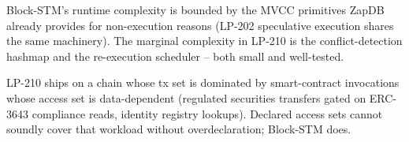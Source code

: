 Block-STM's runtime complexity is bounded by the MVCC primitives
ZapDB already provides for non-execution reasons (LP-202 speculative
execution shares the same machinery). The marginal complexity in
LP-210 is the conflict-detection hashmap and the re-execution
scheduler -- both small and well-tested.

LP-210 ships on a chain whose tx set is dominated by smart-contract
invocations whose access set is data-dependent (regulated securities
transfers gated on ERC-3643 compliance reads, identity registry
lookups). Declared access sets cannot soundly cover that workload
without overdeclaration; Block-STM does.
